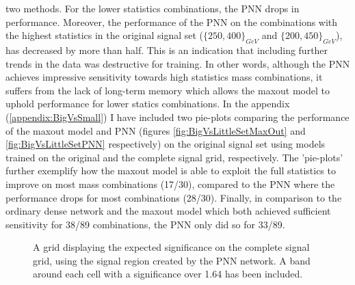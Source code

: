 two methods. For the lower statistics combinations, the \ac{PNN} drops in performance. Moreover, the performance of the \ac{PNN} on the combinations with the highest 
statistics in the original signal set ($\{250,400\}_{GeV}$ and $\{200,450\}_{GeV}$), has decreased by more than half.
This is an indication that including further trends in the data was destructive for training. In other words, although the \ac{PNN} achieves impressive sensitivity towards high 
statistics mass combinations, it suffers from the lack of long-term memory which allows the maxout model to uphold performance for lower statics combinations. In the appendix 
(\ref{appendix:BigVsSmall}) I have included two pie-plots comparing the performance of the maxout model and \ac{PNN} (figures \ref{fig:BigVsLittleSetMaxOut} and \ref{fig:BigVsLittleSetPNN} 
respectively) on the original signal set using models trained on the original and the complete signal grid, respectively. The 'pie-plots' further exemplify how the maxout model is able to exploit 
the full statistics to improve on most mass combinations (17/30), compared to the \ac{PNN} where the performance drops for most combinations (28/30). Finally, in comparison to the ordinary 
dense network and the maxout model which both achieved sufficient sensitivity for 38/89 combinations, the \ac{PNN} only did so for 33/89.\\
\begin{figure}
    \caption{A grid displaying the expected significance on the complete signal grid, using the signal region 
    created by the \acs{PNN} network. A band around each cell with a significance over 1.64 has been included.}
    \label{fig:PNNPCA_FS_MLMGridSig}
\end{figure}
